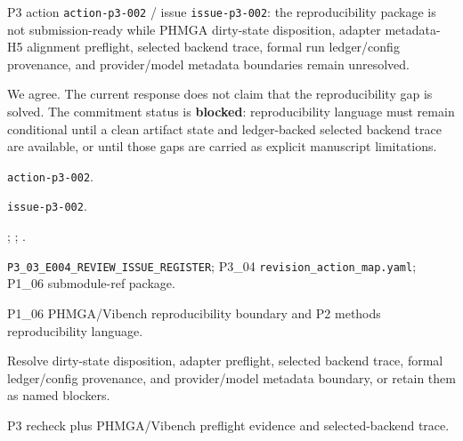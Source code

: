 \reviewer

\begin{revcomment}
P3 action \texttt{action-p3-002} / issue \texttt{issue-p3-002}: the reproducibility package is not submission-ready while PHMGA dirty-state disposition, adapter metadata-H5 alignment preflight, selected backend trace, formal run ledger/config provenance, and provider/model metadata boundaries remain unresolved.
\end{revcomment}
\begin{revresponse}
We agree. The current response does not claim that the reproducibility gap is solved. The commitment status is \textbf{blocked}: reproducibility language must remain conditional until a clean artifact state and ledger-backed selected backend trace are available, or until those gaps are carried as explicit manuscript limitations.

\begin{description}[leftmargin=3.2cm,style=nextline]
    \item[Action id] \texttt{action-p3-002}.
    \item[Issue id] \texttt{issue-p3-002}.
    \item[Source comments] \texttt{}; \texttt{}; \texttt{}.
    \item[Evidence refs] \texttt{P3\_03\_E004\_REVIEW\_ISSUE\_REGISTER}; P3\_04 \texttt{revision\_action\_map.yaml}; P1\_06 submodule-ref package.
    \item[Target location] P1\_06 PHMGA/Vibench reproducibility boundary and P2 methods reproducibility language.
    \item[Required change] Resolve dirty-state disposition, adapter preflight, selected backend trace, formal ledger/config provenance, and provider/model metadata boundary, or retain them as named blockers.
    \item[Validation gate] P3 recheck plus PHMGA/Vibench preflight evidence and selected-backend trace.
\end{description}
\end{revresponse}

